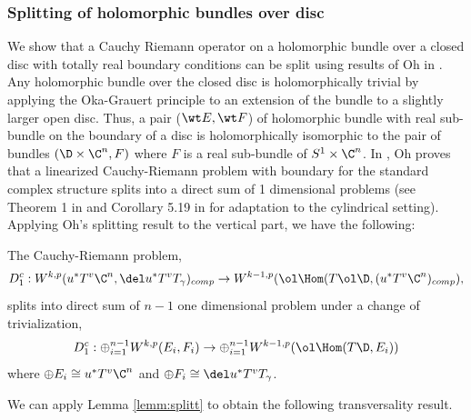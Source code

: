 \subsubsection{Splitting of holomorphic bundles over disc}

We show that a Cauchy Riemann operator on a holomorphic bundle over a closed disc with  totally real boundary conditions can be split using results of Oh in \cite{riemHilb}. Any holomorphic bundle over the closed disc is holomorphically trivial by applying the Oka-Grauert principle to an extension of the bundle to a slightly larger open disc. Thus, a pair ($\wt E,\wt F$) of holomorphic bundle with real sub-bundle on the boundary of a disc is holomorphically isomorphic to the pair of bundles $(\D \times \C^n, F)$ where $F$ is a real sub-bundle of $S^1\times \C^n$. In \cite{riemHilb}, Oh proves that a linearized Cauchy-Riemann problem with boundary for the standard complex structure splits into a direct sum of 1 dimensional problems (see Theorem 1 in \cite{riemHilb} and Corollary 5.19 in
\cite{palmerwoodwardsurg} for adaptation to the cylindrical setting). Applying Oh's splitting result to the vertical part, we have the following: 

\begin{lemma}\label{lemm:splitt}
The Cauchy-Riemann problem, $$D^c_1: W^{k,p}(u^*T^v\C^n,\del u^* T^vT_\gamma)_{comp} \to W^{k-1,p}(\ol \Hom (T\ol \D,(u^*T^v\C^n)_{comp}),$$ splits into direct sum of $n-1$ one dimensional problem under a change of trivialization, $$D^c_1:\oplus_{i=1}^{n-1}W^{k,p}(E_i,F_i) \to \oplus_{i=1}^{n-1}W^{k-1,p}(\ol\Hom (T\D,E_i))$$ where $\oplus E_i \cong u^*T^v \C^n$ and $\oplus F_i \cong \del u^* T^vT_\gamma$.
\end{lemma}

We can apply Lemma \ref{lemm:splitt} to obtain the following transversality result.

